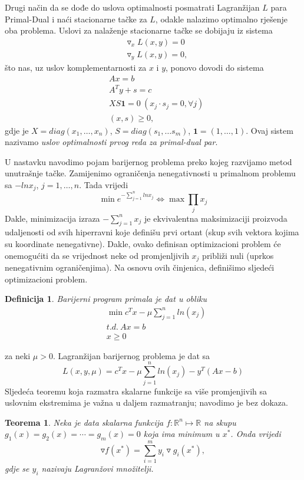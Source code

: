 \documentclass[a4paper, utf8, 11pt, colorlinks]{book}
\newtheorem{definition}{Definicija}[chapter]
\newtheorem{thm}{Teorema}[chapter]
\theoremstyle{definition}
\begin{document}
Drugi način da se dođe do uslova optimalnosti posmatrati Lagranžijan $L$ para Primal-Dual i naći stacionarne tačke za $L$, odakle nalazimo optimalno rješenje oba problema.  Uslovi za nalaženje stacionarne tačke se dobijaju iz sistema
\begin{align}
	&\triangledown_x L(x,y) = 0\\
	&\triangledown_y L(x,y) = 0,
\end{align} 
što nas, uz uslov komplementarnosti za $x$ i $y$, ponovo dovodi do sistema
\begin{align}
	&Ax = b \\
	&A^T y + s = c \\
	&XS\mathbf{1} = 0 \ (x_j \cdot s_j =0 , \forall j) \\
	&  (x, s ) \geq 0,
\end{align}
gdje je $X = diag (x_1, \ldots, x_n)$, $S= diag(s_1,\ldots s_m)$, $\mathbf{1}=(1,\ldots, 1)$. Ovaj sistem nazivamo \emph{uslov optimalnosti prvog reda za primal-dual par}. 

U nastavku navodimo pojam barijernog problema preko kojeg razvijamo metod unutrašnje tačke. Zamijenimo ograničenja nenegativnosti u primalnom problemu sa $-ln x_j$, $j=1,\ldots,n$.   
Tada vrijedi 
$$\min e^{-\sum_{j=1}^n ln x_j} \Leftrightarrow \max \prod_{j} x_j $$
Dakle, minimizacija izraza $-\sum_{j=1}^n x_j$ je ekvivalentna maksimizaciji proizvoda udaljenosti od svih hiperravni koje definišu prvi ortant (skup svih vektora kojima su koordinate nenegativne). Dakle, ovako definisan optimizacioni problem će onemogućiti da se vrijednost neke od promjenljivih $x_j$ približi nuli (uprkos nenegativnim ograničenjima).  Na osnovu ovih činjenica, definišimo sljedeći optimizacioni problem. 

\begin{definition}
	Barijerni program  primala je dat u obliku 
	\begin{align*}
		&\min c^T x - \mu \sum_{j=1}^n ln(x_j) \\
		&{t.d. \ } A x = b \\
		& x \geq 0
	\end{align*}
\end{definition}
za neki $\mu >0$. Lagranžijan barijernog problema je dat sa 
$$  L(x, y, \mu) = c^T x - \mu \sum_{j=1}^n ln(x_j)  - y^T(Ax - b) $$
Sljedeća teoremu koja razmatra skalarne funkcije sa više promjenjivih sa uslovnim ekstremima je važna u daljem razmatranju; navodimo  je bez dokaza. 
\begin{thm}
	Neka je data skalarna funkcija  $f:\mathbb{R}^n \mapsto \mathbb{R}$ na skupu $g_1(x)=g_2(x)= \cdots = g_m(x) =0$ koja ima minimum u $x^*$. Onda vrijedi 
	$$ \triangledown f (x^*) = \sum_{i=1}^m y_i \triangledown g_i(x^*),$$
	gdje se $y_i$ nazivaju Lagranžovi množitelji. 
\end{thm}
\end{document}
